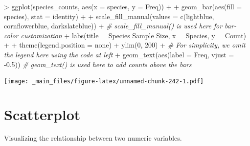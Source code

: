 \documentclass[
]{book}
\newenvironment{Shaded}{\begin{snugshade}}{\end{snugshade}}
\newcommand{\AttributeTok}[1]{\textcolor[rgb]{0.77,0.63,0.00}{#1}}
\newcommand{\CommentTok}[1]{\textcolor[rgb]{0.56,0.35,0.01}{\textit{#1}}}
\newcommand{\DecValTok}[1]{\textcolor[rgb]{0.00,0.00,0.81}{#1}}
\newcommand{\FloatTok}[1]{\textcolor[rgb]{0.00,0.00,0.81}{#1}}
\newcommand{\FunctionTok}[1]{\textcolor[rgb]{0.00,0.00,0.00}{#1}}
\newcommand{\NormalTok}[1]{#1}
\newcommand{\SpecialCharTok}[1]{\textcolor[rgb]{0.00,0.00,0.00}{#1}}
\newcommand{\StringTok}[1]{\textcolor[rgb]{0.31,0.60,0.02}{#1}}
\begin{document}
\begin{Shaded}
\begin{Highlighting}[]
\SpecialCharTok{\textgreater{}} \FunctionTok{ggplot}\NormalTok{(species\_counts, }\FunctionTok{aes}\NormalTok{(}\AttributeTok{x =}\NormalTok{ species, }\AttributeTok{y =}\NormalTok{ Freq)) }\SpecialCharTok{+}
\SpecialCharTok{+}   \FunctionTok{geom\_bar}\NormalTok{(}\FunctionTok{aes}\NormalTok{(}\AttributeTok{fill =}\NormalTok{ species), }\AttributeTok{stat =} \StringTok{\textquotesingle{}identity\textquotesingle{}}\NormalTok{) }\SpecialCharTok{+}
\SpecialCharTok{+}   \FunctionTok{scale\_fill\_manual}\NormalTok{(}\AttributeTok{values =} \FunctionTok{c}\NormalTok{(}\StringTok{\textquotesingle{}lightblue\textquotesingle{}}\NormalTok{, }\StringTok{\textquotesingle{}cornflowerblue\textquotesingle{}}\NormalTok{, }\StringTok{\textquotesingle{}darkslateblue\textquotesingle{}}\NormalTok{)) }\SpecialCharTok{+} \CommentTok{\# scale\_fill\_manual() is used here for bar{-}color customization}
\SpecialCharTok{+}   \FunctionTok{labs}\NormalTok{(}\AttributeTok{title =} \StringTok{\textquotesingle{}Species Sample Size\textquotesingle{}}\NormalTok{, }\AttributeTok{x =} \StringTok{\textquotesingle{}Species\textquotesingle{}}\NormalTok{, }\AttributeTok{y =} \StringTok{\textquotesingle{}Count\textquotesingle{}}\NormalTok{) }\SpecialCharTok{+}
\SpecialCharTok{+}   \FunctionTok{theme}\NormalTok{(}\AttributeTok{legend.position =} \StringTok{\textquotesingle{}none\textquotesingle{}}\NormalTok{) }\SpecialCharTok{+} \FunctionTok{ylim}\NormalTok{(}\DecValTok{0}\NormalTok{, }\DecValTok{200}\NormalTok{) }\SpecialCharTok{+} \CommentTok{\# For simplicity, we omit the legend here using the code at left}
\SpecialCharTok{+}   \FunctionTok{geom\_text}\NormalTok{(}\FunctionTok{aes}\NormalTok{(}\AttributeTok{label =}\NormalTok{ Freq, }\AttributeTok{vjust =} \SpecialCharTok{{-}}\FloatTok{0.5}\NormalTok{)) }\CommentTok{\# geom\_text() is used here to add counts above the bars}
\end{Highlighting}
\end{Shaded}

\texttt{[image: \_main\_files/figure-latex/unnamed-chunk-242-1.pdf]}

\hypertarget{scatterplot}{%
\section{Scatterplot}\label{scatterplot}}

Visualizing the relationship between two numeric variables.
\end{document}

